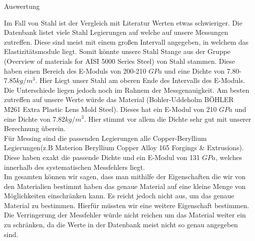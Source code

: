 \documentclass[twoside]{protokoll}
\begin{document}
\begin{aufgabe}{Auswertung}
 
Im Fall von Stahl ist der Vergleich mit Literatur Werten etwas schwieriger. 
Die Datenbank listet viele Stahl Legierungen auf welche auf unsere Messungen zutreffen.
Diese sind meist mit einem großen Intervall angegeben, in welchem das Elastizitätsmodule liegt.
Somit könnte unsere Stahl Stange aus der Gruppe (Overview of materials for AISI 5000 Series Steel) von Stahl stammen. Diese haben einen Bereich des E-Moduls von 200-210 $GPa$ und eine Dichte von 7.80-7.85$kg/m^3$. Hier Liegt unser Stahl am oberen Ende des Intervalls des E-Moduls. Die Unterschiede liegen jedoch noch im Rahnem der Messgenauigkeit. 
Am besten zutreffen auf unsere Werte würde das Material (Bohler-Uddeholm BÖHLER M261 Extra Plastic Lens Mold Steel). Dieses hat ein E-Modul von 210 $GPa$ und eine Dichte von
7.82$kg/m^3$. Hier stimmt vor allem die Dichte sehr gut mit unserer Berechnung überein.\\
 
Für Messing sind die passenden Legierungen alle Copper-Beryllium Legierungen(z.B Materion Beryllium Copper Alloy 165 Forgings \& Extrusions).
Diese haben exakt die passende Dichte und ein E-Modul von 131 $GPa$, welches innerhalb des systematischen Messfehlers liegt.\\
 
Im gesamten können wir sagen, dass man mithilfe der Eigenschaften die wir von den Materialien bestimmt haben das genaue Material auf eine kleine Menge von Möglichkeiten einschränken kann. 
Es reicht jedoch nicht aus, um das genaue Material zu bestimmen. Hierfür müssten wir 
eine weitere Eigenschaft bestimmen. Die Verringerung der Messfehler würde nicht reichen
um das Material weiter ein zu schränken, da die Werte in der Datenbank meist nicht so genau angegeben sind. 
\end{aufgabe}




\end{document}
